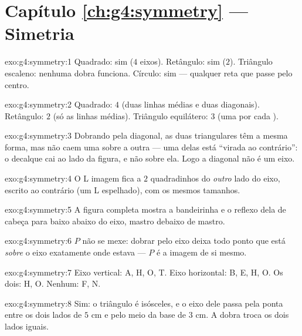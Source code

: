 \section*{Capítulo \ref{ch:g4:symmetry} --- Simetria}

\begin{solution}{exo:g4:symmetry:1}
Quadrado: sim ($4$ eixos). Retângulo: sim ($2$). Triângulo escaleno:
nenhuma dobra funciona. Círculo: sim --- qualquer reta que passe pelo
centro.
\end{solution}

\begin{solution}{exo:g4:symmetry:2}
Quadrado: $4$ (duas linhas médias e duas diagonais). Retângulo: $2$
(só as linhas médias). Triângulo equilátero: $3$ (uma por cada
).
\end{solution}

\begin{solution}{exo:g4:symmetry:3}
Dobrando pela diagonal, as duas  triangulares têm a mesma
forma, mas não caem uma sobre a outra --- uma delas está ``virada ao
contrário'': o decalque cai ao lado da figura, e não sobre ela. Logo
a diagonal não é um eixo.
\end{solution}

\begin{solution}{exo:g4:symmetry:4}
O L imagem fica a $2$ quadradinhos do \emph{outro} lado do eixo,
escrito ao contrário (um L espelhado), com os mesmos tamanhos.
\end{solution}

\begin{solution}{exo:g4:symmetry:5}
A figura completa mostra a bandeirinha e o reflexo dela de cabeça
para baixo abaixo do eixo, mastro debaixo de mastro.
\end{solution}

\begin{solution}{exo:g4:symmetry:6}
$P$ não se mexe: dobrar pelo eixo deixa todo ponto que está
\emph{sobre} o eixo exatamente onde estava --- $P$ é a imagem de si
mesmo.
\end{solution}

\begin{solution}{exo:g4:symmetry:7}
Eixo vertical: A, H, O, T. Eixo horizontal: B, E, H, O. Os dois: H,
O. Nenhum: F, N.
\end{solution}

\begin{solution}{exo:g4:symmetry:8}
Sim: o triângulo é isósceles, e o eixo dele passa pela ponta entre os
dois lados de $5$ cm e pelo meio da base de $3$ cm. A dobra troca os
dois lados iguais.
\end{solution}

